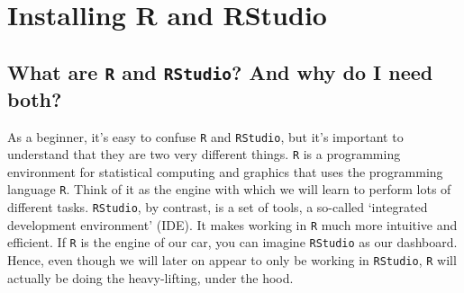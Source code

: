 \documentclass[
  letterpaper,
  DIV=11,
  numbers=noendperiod]{scrreprt}
\begin{document}
\section{Installing R and RStudio}\label{installing-r-and-rstudio-1}

\subsection{\texorpdfstring{What are \texttt{R} and \texttt{RStudio}?
And why do I need
both?}{What are R and RStudio? And why do I need both?}}\label{what-are-r-and-rstudio-and-why-do-i-need-both}

As a beginner, it's easy to confuse \texttt{R} and \texttt{RStudio}, but
it's important to understand that they are two very different things.
\texttt{R} is a programming environment for statistical computing and
graphics that uses the programming language \texttt{R}. Think of it as
the engine with which we will learn to perform lots of different tasks.
\texttt{RStudio}, by contrast, is a set of tools, a so-called
`integrated development environment' (IDE). It makes working in
\texttt{R} much more intuitive and efficient. If \texttt{R} is the
engine of our car, you can imagine \texttt{RStudio} as our dashboard.
Hence, even though we will later on appear to only be working in
\texttt{RStudio}, \texttt{R} will actually be doing the heavy-lifting,
under the hood.
\end{document}
